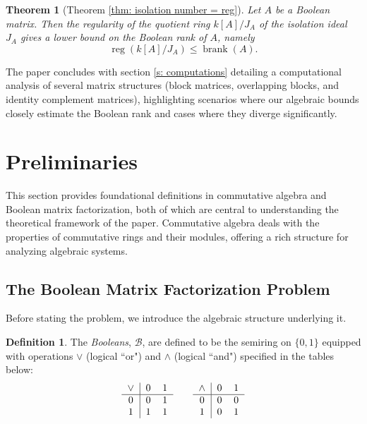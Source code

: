 \documentclass[11pt,letterpaper, reqno]{amsart}
\newtheorem{introthm}{Theorem}[section]
\theoremstyle{definition}
\newtheorem{definition}[theorem]{Definition}
\theoremstyle{remark}
\newcommand{\Bc}{\mathcal{B}}
\DeclareMathOperator{\reg}{reg}
\DeclareMathOperator{\brank}{brank}
\numberwithin{equation}{section}
\begin{document}
 \begin{introthm}[Theorem \ref{thm: isolation number = reg}]
Let $A$ be a Boolean matrix. Then the regularity of the quotient ring $k[A]/J_A$ of the isolation ideal $J_A$ gives a lower bound on the Boolean rank of $A$, namely
\[
\reg(k[A]/J_A)\leq \brank(A).
\]
\end{introthm}
 
  The paper concludes with section \ref{s: computations} detailing a computational analysis of several matrix structures (block matrices, overlapping blocks, and identity complement matrices), highlighting scenarios where our algebraic bounds closely estimate the Boolean rank and cases where they diverge significantly. %

  


\section{Preliminaries}
This section provides foundational definitions in commutative algebra and Boolean matrix factorization, both of which are central to understanding the theoretical framework of the paper. Commutative algebra deals with the properties of commutative rings and their modules, offering a rich structure for analyzing algebraic systems.
\subsection{The Boolean Matrix Factorization Problem}
Before stating the problem, we introduce the algebraic structure underlying it.

\begin{definition}
The \textit{Booleans}, $\Bc$, are defined to be the semiring on $\{0,1\}$ equipped with operations $\vee$ (logical ``or") and $\wedge$ (logical ``and") specified in the tables below:
\[
\begin{tabular}{c|cc}
    $\vee$ & 0 & 1 \\
    \hline
    0 & 0 & 1\\
    1 & 1 & 1
\end{tabular}
\qquad
\begin{tabular}{c|cc}
    $\wedge$ & 0 & 1 \\
    \hline
    0 & 0 & 0\\
    1 & 0 & 1
\end{tabular}
\]
\end{definition}
\end{document}
